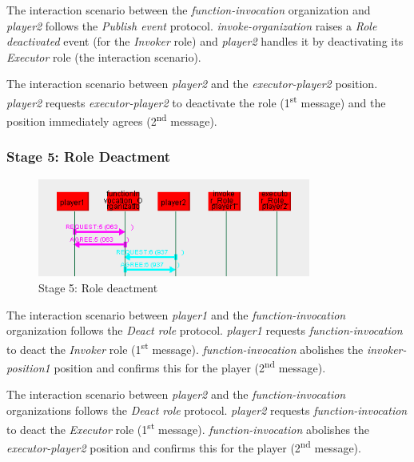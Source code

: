 The {} interaction scenario between the \textit{function-invocation} organization and \textit{player2} follows the \textit{Publish event} protocol.
\textit{invoke-organization} raises a \textit{Role deactivated} event (for the \textit{Invoker} role) and \textit{player2} handles it by deactivating its \textit{Executor} role (the {} interaction scenario).

The {} interaction scenario between \textit{player2} and the \textit{executor-player2} position.
\textit{player2} requests \textit{executor-player2} to deactivate the role (1\textsuperscript{st} message) and the position immediately agrees (2\textsuperscript{nd} message).

\subsubsection*{Stage 5: Role Deactment}

\begin{figure}[H]
	\centering
	\includegraphics[width=0.8\textwidth]{images/examples/example1-stage5.png}
	\caption{Stage 5: Role deactment}
	\label{figure:example1-stage5}
\end{figure} 

The {} interaction scenario between \textit{player1} and the \textit{function-invocation} organization follows the \textit{Deact role} protocol.
\textit{player1} requests \textit{function-invocation} to deact the \textit{Invoker} role (1\textsuperscript{st} message).
\textit{function-invocation} abolishes the \textit{invoker-position1} position and confirms this for the player (2\textsuperscript{nd} message).

The {} interaction scenario between \textit{player2} and the \textit{function-invocation} organizations follows the \textit{Deact role} protocol.
\textit{player2} requests \textit{function-invocation} to deact the \textit{Executor} role (1\textsuperscript{st} message).
\textit{function-invocation} abolishes the \textit{executor-player2} position and confirms this for the player (2\textsuperscript{nd} message).